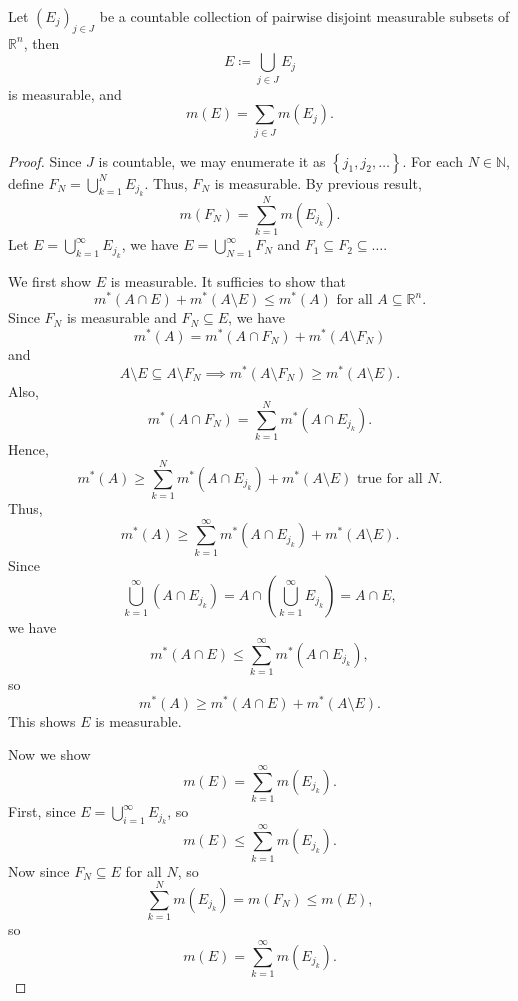 \begin{lemma} \label{lm: countable additivity}
    Let \((E_j)_{j \in J}\) be a countable collection of pairwise disjoint measurable subsets of \(\mathbb{R} ^n\), then 
    \[
        E \coloneqq \bigcup_{j \in J} E_j 
    \]  
    is measurable, and 
    \[
        m(E) = \sum_{j \in J} m(E_j). 
    \]
\end{lemma}

\begin{proof}
    Since \(J\) is countable, we may enumerate it as \(\left\{ j_1, j_2, \dots  \right\} \). For each \(N \in \mathbb{N} \), define \(F_N = \bigcup_{k=1}^{N} E_{j_k} \). Thus, \(F_N\) is measurable. By previous result,
    \[
        m(F_N) = \sum_{k=1}^N m(E_{j_k}). 
    \]     
    Let \(E = \bigcup_{k=1}^{\infty} E_{j_k} \), we have \(E = \bigcup_{N=1}^{\infty} F_N \) and \(F_1 \subseteq F_2 \subseteq \dots \). 

    We first show \(E\) is measurable. It sufficies to show that 
    \[
        m^*(A \cap E) + m^*(A \setminus E) \le m^*(A) \text{ for all } A \subseteq \mathbb{R} ^n.  
    \]    
    Since \(F_N\) is measurable and \(F_N \subseteq E\), we have 
    \[
        m^*(A) = m^*(A \cap F_N) + m^*(A \setminus F_N)
    \]  
    and 
    \[
        A \setminus E \subseteq A \setminus F_N  \implies m^*(A \setminus F_N) \ge m^*(A \setminus E).
    \]
    Also,
    \[
        m^*(A \cap F_N) = \sum_{k=1}^N m^*(A \cap E_{j_k}). 
    \]
    Hence,
    \[
        m^*(A) \ge \sum_{k=1}^N m^*(A \cap E_{j_k}) + m^*(A \setminus E) \text{ true for all }N.  
    \]
    Thus,
    \[
        m^*(A) \ge \sum_{k=1}^{\infty} m^*(A \cap E_{j_k}) + m^*(A \setminus E). 
    \]
    Since 
    \[
        \bigcup_{k=1}^{\infty} (A \cap E_{j_k}) = A \cap \left( \bigcup_{k=1}^{\infty} E_{j_k}  \right) = A \cap E,  
    \]
    we have 
    \[
        m^*(A \cap E) \le \sum_{k=1}^{\infty} m^*(A \cap E_{j_k}), 
    \]
    so 
    \[
        m^*(A) \ge m^*(A \cap E) + m^*(A \setminus E).
    \]
    This shows \(E\) is measurable.
    
    Now we show 
    \[
        m(E) = \sum_{k=1}^{\infty} m(E_{j_k}). 
    \]
    First, since \(E = \bigcup_{i=1}^{\infty} E_{j_k} \), so 
    \[
        m(E) \le \sum_{k=1}^{\infty} m(E_{j_k}). 
    \] 
    Now since \(F_N \subseteq E\) for all \(N\), so 
    \[
        \sum_{k=1}^N m(E_{j_k}) = m(F_N) \le m(E), 
    \]  
    so 
    \[
        m(E) = \sum_{k=1}^{\infty} m(E_{j_k}). 
    \]

\end{proof}

